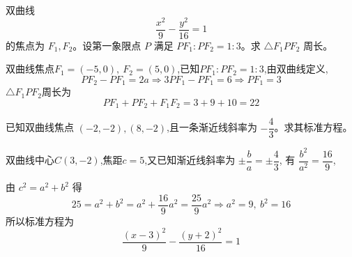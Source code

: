 \begin{questions}
    \question 双曲线 
    \[
    \frac{x^{2}}{9}-\frac{y^{2}}{16}=1
    \] 
    的焦点为 \(F_1,F_2\)。设第一象限点 \(P\) 满足 \(PF_1:PF_2=1:3\)。求 \(\triangle F_1PF_2\) 周长。  
    \begin{solution}
        双曲线焦点$F_1=(-5,0),\ F_2=(5,0)$,已知$PF_1:PF_2=1:3$,由双曲线定义,
        \[
        PF_2 - PF_1 = 2a \Rightarrow 3PF_1 - PF_1 = 6 \Rightarrow PF_1 = 3
        \]
        \(\triangle F_1PF_2\)周长为
        \[
        PF_1 + PF_2 + F_1F_2 = 3 + 9 + 10 = 22
        \]
    \end{solution}
    
    \question 已知双曲线焦点 \((-2,-2),(8,-2)\),且一条渐近线斜率为 \(-\dfrac{4}{3}\)。求其标准方程。  
    \begin{solution}
        双曲线中心$C(3, -2)$,焦距$c = 5$,又已知渐近线斜率为 $\pm \dfrac{b}{a} = \pm \dfrac{4}{3}$, 有 
        $\dfrac{b^2}{a^2} = \dfrac{16}{9}$,
        
        由 $c^2 = a^2 + b^2$ 得
        \[
        25 = a^2 + b^2 = a^2 + \frac{16}{9}a^2 = \frac{25}{9}a^2
        \Rightarrow a^2 = 9,\ b^2 = 16
        \]
        所以标准方程为
        \[
        \dfrac{(x - 3)^2}{9} - \dfrac{(y + 2)^2}{16} = 1
        \]
    \end{solution}


\end{questions}
